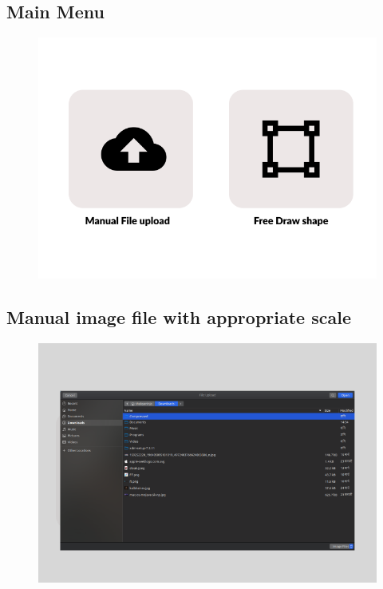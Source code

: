 	\subsection{Main Menu} \label{Appendix: Main Menu}
		\begin{figure}[H]
			\centering
				\includegraphics[width=1\textwidth]{img/chapter_7/mm.png}
				
		\end{figure}
				
	\subsection{Manual image file with appropriate scale} \label{Appendix: Manual image file with appropriate scale}
		\begin{figure}[H]
			\centering
				\includegraphics[width=1\textwidth]{img/chapter_7/mu.png}
				
		\end{figure}
